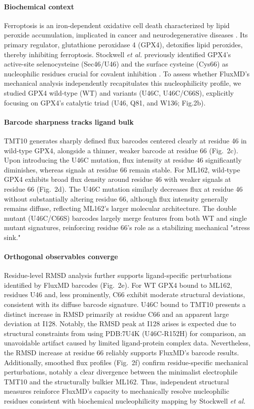 \documentclass[pdflatex,sn-mathphys-num]{sn-jnl}
\begin{document}
\paragraph{Biochemical context}
Ferroptosis is an iron-dependent oxidative cell death characterized by lipid peroxide accumulation, implicated in cancer and neurodegenerative diseases \cite{Dixon2012}. Its primary regulator, glutathione peroxidase 4 (GPX4), detoxifies lipid peroxides, thereby inhibiting ferroptosis. Stockwell \textit{et al.} previously identified GPX4's active-site selenocysteine (Sec46/U46) and the surface cysteine (Cys66) as nucleophilic residues crucial for covalent inhibition \cite{Liu2022}. To assess whether FluxMD's mechanical analysis independently recapitulates this nucleophilicity profile, we studied GPX4 wild-type (WT) and variants (U46C, U46C/C66S), explicitly focusing on GPX4's catalytic triad (U46, Q81, and W136; Fig.2b)\cite{StockwellPatent2022}.

\paragraph{Barcode sharpness tracks ligand bulk}
TMT10 generates sharply defined flux barcodes centered clearly at residue 46 in wild-type GPX4, alongside a thinner, weaker barcode at residue 66 (Fig.~2c). Upon introducing the U46C mutation, flux intensity at residue 46 significantly diminishes, whereas signals at residue 66 remain stable. For ML162, wild-type GPX4 exhibits broad flux density around residue 46 with weaker signals at residue 66 (Fig.~2d). The U46C mutation similarly decreases flux at residue 46 without substantially altering residue 66, although flux intensity generally remains diffuse, reflecting ML162's larger molecular architecture. The double mutant (U46C/C66S) barcodes largely merge features from both WT and single mutant signatures, reinforcing residue 66's role as a stabilizing mechanical "stress sink."

\paragraph{Orthogonal observables converge}
Residue-level RMSD analysis further supports ligand-specific perturbations identified by FluxMD barcodes (Fig.~2e). For WT GPX4 bound to ML162, residues U46 and, less prominently, C66 exhibit moderate structural deviations, consistent with its diffuse barcode signature. U46C bound to TMT10 presents a distinct increase in RMSD primarily at residue C66 and an apparent large deviation at I128. Notably, the RMSD peak at I128 arises is expected due to structural constraints from using PDB:7U4K (U46C-R152H) for comparison, an unavoidable artifact caused by limited ligand-protein complex data. Nevertheless, the RMSD increase at residue 66 reliably supports FluxMD's barcode results. Additionally, smoothed flux profiles (Fig.~2f) confirm residue-specific mechanical perturbations, notably a clear divergence between the minimalist electrophile TMT10 and the structurally bulkier ML162. Thus, independent structural measures reinforce FluxMD's capacity to mechanically resolve nucleophilic residues consistent with biochemical nucleophilicity mapping by Stockwell \textit{et al.}
\end{document}
